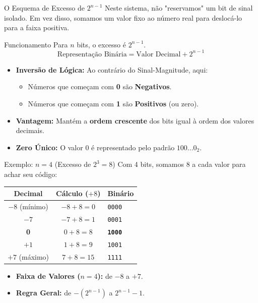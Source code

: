 \begin{frame}{O Esquema de Excesso de $2^{n-1}$}
    Neste sistema, não "reservamos" um bit de sinal isolado. Em vez disso, somamos um valor fixo ao número real para deslocá-lo para a faixa positiva.

    \begin{block}{Funcionamento}
        Para $n$ bits, o excesso é $2^{n-1}$.
        $$\text{Representação Binária} = \text{Valor Decimal} + 2^{n-1}$$
    \end{block}

    \begin{itemize}
        \item \textbf{Inversão de Lógica:} Ao contrário do Sinal-Magnitude, aqui:
              \begin{itemize}
                  \item Números que começam com \textbf{0} são \textbf{Negativos}.
                  \item Números que começam com \textbf{1} são \textbf{Positivos} (ou zero).
              \end{itemize}
        \item \textbf{Vantagem:} Mantém a \textbf{ordem crescente} dos bits igual à ordem dos valores decimais.
        \item \textbf{Zero Único:} O valor 0 é representado pelo padrão $100...0_2$.
    \end{itemize}
\end{frame}

\begin{frame}{Exemplo: $n = 4$ (Excesso de $2^3 = 8$)}
    Com 4 bits, somamos 8 a cada valor para achar seu código:

    \begin{table}[]
        \centering
        \begin{tabular}{|c|c|l|}
            \hline
            \textbf{Decimal} & \textbf{Cálculo ($+8$)} & \textbf{Binário}       \\ \hline
            $-8$ (mínimo)    & $-8 + 8 = 0$            & \texttt{0000}          \\ \hline
            $-7$             & $-7 + 8 = 1$            & \texttt{0001}          \\ \hline
            \textbf{0}       & \textbf{$0 + 8 = 8$}    & \textbf{\texttt{1000}} \\ \hline
            $+1$             & $1 + 8 = 9$             & \texttt{1001}          \\ \hline
            $+7$ (máximo)    & $7 + 8 = 15$            & \texttt{1111}          \\ \hline
        \end{tabular}
    \end{table}

    \begin{itemize}
        \item \textbf{Faixa de Valores ($n=4$):} de $-8$ a $+7$.
        \item \textbf{Regra Geral:} de $-(2^{n-1})$ a $2^{n-1}-1$.
    \end{itemize}
\end{frame}

